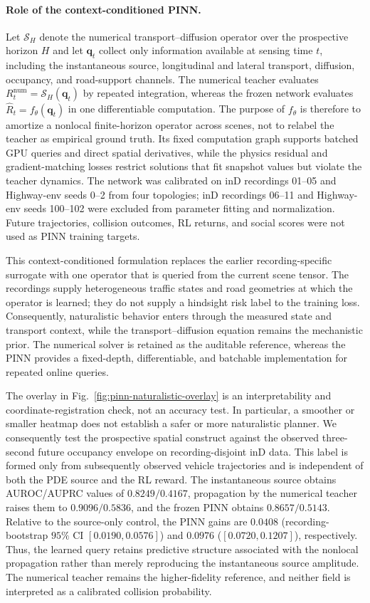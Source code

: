 \paragraph{Role of the context-conditioned PINN.}
Let $\mathcal{S}_{H}$ denote the numerical transport--diffusion operator over
the prospective horizon $H$ and let $\mathbf{q}_{t}$ collect only information
available at sensing time $t$, including the instantaneous source,
longitudinal and lateral transport, diffusion, occupancy, and road-support
channels. The numerical teacher evaluates
$R^{\mathrm{num}}_{t}=\mathcal{S}_{H}(\mathbf{q}_{t})$ by repeated integration,
whereas the frozen network evaluates
$\widehat R_{t}=f_{\theta}(\mathbf{q}_{t})$ in one differentiable computation.
The purpose of $f_{\theta}$ is therefore to amortize a nonlocal finite-horizon
operator across scenes, not to relabel the teacher as empirical ground truth.
Its fixed computation graph supports batched GPU queries and direct spatial
derivatives, while the physics residual and gradient-matching losses restrict
solutions that fit snapshot values but violate the teacher dynamics. The
network was calibrated on inD recordings 01--05 and Highway-env seeds 0--2
from four topologies; inD recordings 06--11 and Highway-env seeds 100--102
were excluded from parameter fitting and normalization. Future trajectories,
collision outcomes, RL returns, and social scores were not used as PINN
training targets.

This context-conditioned formulation replaces the earlier recording-specific
surrogate with one operator that is queried from the current scene tensor. The
recordings supply heterogeneous traffic states and road geometries at which
the operator is learned; they do not supply a hindsight risk label to the
training loss. Consequently, naturalistic behavior enters through the measured
state and transport context, while the transport--diffusion equation remains
the mechanistic prior. The numerical solver is retained as the auditable
reference, whereas the PINN provides a fixed-depth, differentiable, and
batchable implementation for repeated online queries.

The overlay in Fig.~\ref{fig:pinn-naturalistic-overlay} is an interpretability
and coordinate-registration check, not an accuracy test. In particular, a
smoother or smaller heatmap does not establish a safer or more naturalistic
planner. We consequently test the prospective spatial construct against the
observed three-second future occupancy envelope on recording-disjoint inD
data. This label is formed only from subsequently observed vehicle trajectories
and is independent of both the PDE source and the RL reward. The instantaneous
source obtains AUROC/AUPRC values of $0.8249/0.4167$, propagation by the numerical
teacher raises them to $0.9096/0.5836$, and the frozen PINN obtains
$0.8657/0.5143$. Relative to the source-only control, the PINN gains are
$0.0408$ (recording-bootstrap $95\%$ CI $[0.0190,0.0576]$) and $0.0976$
($[0.0720,0.1207]$), respectively. Thus, the learned query retains predictive
structure associated with the nonlocal propagation rather than merely
reproducing the instantaneous source amplitude. The numerical teacher remains
the higher-fidelity reference, and neither field is interpreted as a
calibrated collision probability.

